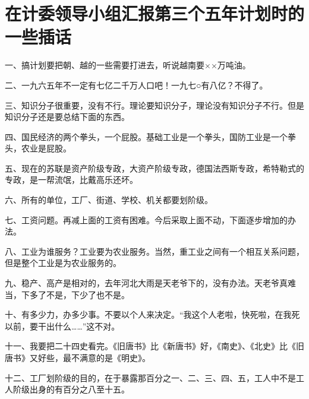 \section[在计委领导小组汇报第三个五年计划时的一些插话（一九六四年五月十一日）]{在计委领导小组汇报第三个五年计划时的一些插话}


一、搞计划要把朝、越的一些需要打进去，听说越南要××万吨油。

二、一九六五年不一定有七亿二千万人口吧！一九七○有八亿？不得了。

三、知识分子很重要，没有不行。理论要知识分子，理论没有知识分子不行。但是知识分子还是要总结下面的东西。

四、国民经济的两个拳头，一个屁股。基础工业是一个拳头，国防工业是一个拳头，农业是屁股。

五、现在的苏联是资产阶级专政，大资产阶级专政，德国法西斯专政，希特勒式的专政，是一帮流氓，比戴高乐还坏。

六、所有的单位，工厂、街道、学校、机关都要划阶级。

七、工资问题。再减上面的工资有困难。今后采取上面不动，下面逐步增加的办法。

八、工业为谁服务？工业要为农业服务。当然，重工业之间有一个相互关系问题，但是整个工业是为农业服务的。

九、稳产、高产是相对的，去年河北大雨是天老爷下的，没有办法。天老爷真难当，下多了不是，下少了也不是。


十、有多少力，办多少事。不要以个人来决定。“我这个人老啦，快死啦，在我死以前，要干出什么……”这不对。

十一、我要把二十四史看完。《旧唐书》比《新唐书》好，《南史》、《北史》比《旧唐书》又好些，最不满意的是《明史》。

十二、工厂划阶级的目的，在于暴露那百分之一、二、三、四、五，工人中不是工人阶级出身的有百分之八至十五。


